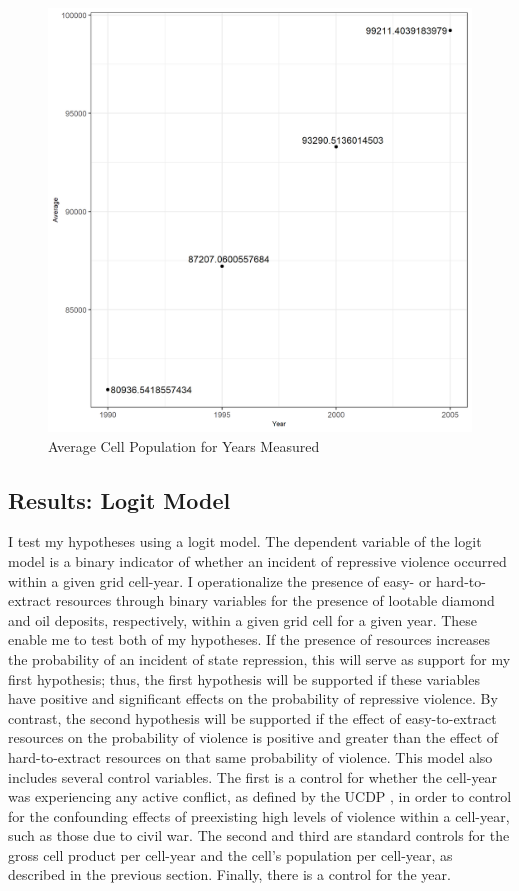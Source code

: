 \begin{figure}
	\includegraphics[scale=.7]{fig7}
	\caption{Average Cell Population for Years Measured}
\end{figure} 

\subsection*{Results: Logit Model}
I test my hypotheses using a logit model. The dependent variable of the logit model is a binary indicator of whether an incident of repressive violence occurred within a given grid cell-year. I operationalize the presence of easy- or hard-to-extract resources through binary variables for the presence of lootable diamond and oil deposits, respectively, within a given grid cell for a given year. These enable me to test both of my hypotheses. If the presence of resources increases the probability of an incident of state repression, this will serve as support for my first hypothesis; thus, the first hypothesis will be supported if these variables have positive and significant effects on the probability of repressive violence. By contrast, the second hypothesis will be supported if the effect of easy-to-extract resources on the probability of violence is positive and greater than the effect of hard-to-extract resources on that same probability of violence. This model also includes several control variables. The first is a control for whether the cell-year was experiencing any active conflict, as defined by the UCDP \cite{Stina19}, in order to control for the confounding effects of preexisting high levels of violence within a cell-year, such as those due to civil war. The second and third are standard controls for the gross cell product per cell-year and the cell’s population per cell-year, as described in the previous section. Finally, there is a control for the year.

